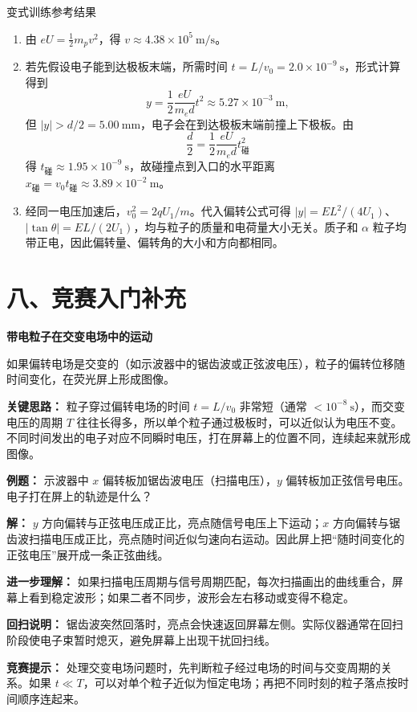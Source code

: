 \begin{learningbox}{变式训练参考结果}
\begin{enumerate}[itemsep=0.45em,topsep=0.3em,parsep=0pt]
  \item 由 $eU=\frac12m_pv^2$，得
  $v\approx4.38\times10^5\ \mathrm{m/s}$。
  \item 若先假设电子能到达极板末端，所需时间
  $t=L/v_0=2.0\times10^{-9}\ \mathrm s$，形式计算得到
  \[
  y=\frac12\frac{eU}{m_ed}t^2\approx5.27\times10^{-3}\ \mathrm m,
  \]
  但 $|y|>d/2=5.00\ \mathrm{mm}$，电子会在到达极板末端前撞上下极板。由
  \[
  \frac d2=\frac12\frac{eU}{m_ed}t_{\text{碰}}^2
  \]
  得 $t_{\text{碰}}\approx1.95\times10^{-9}\ \mathrm s$，故碰撞点到入口的水平距离
  $x_{\text{碰}}=v_0t_{\text{碰}}\approx3.89\times10^{-2}\ \mathrm m$。
  \item 经同一电压加速后，$v_0^2=2qU_1/m$。代入偏转公式可得
  $|y|=EL^2/(4U_1)$、$|\tan\theta|=EL/(2U_1)$，均与粒子的质量和电荷量大小无关。质子和 $\alpha$ 粒子均带正电，因此偏转量、偏转角的大小和方向都相同。
\end{enumerate}
\end{learningbox}

\section*{八、竞赛入门补充}

\begin{competitionbox}
\textbf{带电粒子在交变电场中的运动}

如果偏转电场是交变的（如示波器中的锯齿波或正弦波电压），粒子的偏转位移随时间变化，在荧光屏上形成图像。

\begin{center}


\label{fig:alternating-field-trace}
\end{center}

\textbf{关键思路：} 粒子穿过偏转电场的时间 $t = L/v_0$ 非常短（通常 $< 10^{-8}\ \mathrm{s}$），而交变电压的周期 $T$ 往往长得多，所以单个粒子通过极板时，可以近似认为电压不变。不同时间发出的电子对应不同瞬时电压，打在屏幕上的位置不同，连续起来就形成图像。

\textbf{例题：} 示波器中 $x$ 偏转板加锯齿波电压（扫描电压），$y$ 偏转板加正弦信号电压。电子打在屏上的轨迹是什么？

\textbf{解：} $y$ 方向偏转与正弦电压成正比，亮点随信号电压上下运动；$x$ 方向偏转与锯齿波扫描电压成正比，亮点随时间近似匀速向右运动。因此屏上把“随时间变化的正弦电压”展开成一条正弦曲线。

\textbf{进一步理解：} 如果扫描电压周期与信号周期匹配，每次扫描画出的曲线重合，屏幕上看到稳定波形；如果二者不同步，波形会左右移动或变得不稳定。

\textbf{回扫说明：} 锯齿波突然回落时，亮点会快速返回屏幕左侧。实际仪器通常在回扫阶段使电子束暂时熄灭，避免屏幕上出现干扰回扫线。

\textbf{竞赛提示：} 处理交变电场问题时，先判断粒子经过电场的时间与交变周期的关系。如果 $t \ll T$，可以对单个粒子近似为恒定电场；再把不同时刻的粒子落点按时间顺序连起来。
\end{competitionbox}


